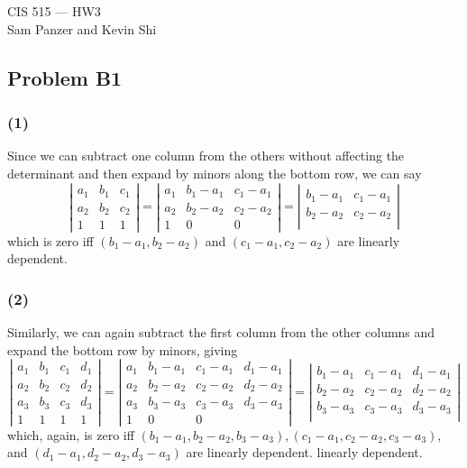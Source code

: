 \documentclass{article}
\begin{document}
\begin{center}CIS 515 --- HW3\\Sam Panzer and Kevin Shi\end{center}
\subsection{Problem B1}
\subsubsection{(1)}
Since we can subtract one column from the others without affecting the
determinant and then expand by minors along the bottom row, we can say
\[
\left|
\begin{array}{ccc}
  a_1 & b_1 & c_1 \\
  a_2 & b_2 & c_2 \\
  1 & 1 & 1
\end{array}
\right|
=
\left|
\begin{array}{ccc}
  a_1 & b_1 - a_1 & c_1 -a_1 \\
  a_2 & b_2  - a_2& c_2  - a_2\\
  1 & 0 & 0
\end{array}
\right|
=\left|
\begin{array}{cc}
  b_1 - a_1 & c_1 - a_1 \\
  b_2 - a_2 & c_2 - a_2 \\
\end{array}
\right|
\]
which is zero iff $(b_1 - a_1, b_2 - a_2)$ and $(c_1 - a_1, c_2 - a_2)$ are
linearly dependent.
\subsubsection{(2)}
Similarly, we can again subtract the first column from the other columns and
expand the bottom row by minors, giving
\[
\left|
\begin{array}{cccc}
  a_1 & b_1 & c_1 & d_1 \\
  a_2 & b_2 & c_2  & d_2\\
  a_3 & b_3 & c_3  & d_3\\
  1 & 1 & 1 & 1
\end{array}
\right|
=
\left|
\begin{array}{cccc}
  a_1 & b_1 - a_1 & c_1 - a_1 & d_1 - a_1\\
  a_2 & b_2 - a_2 & c_2 - a_2 & d_2 - a_2\\
  a_3 & b_3 - a_3 & c_3 - a_3 & d_3 - a_3\\
  1 & 0 & 0
\end{array}
\right|
=\left|
\begin{array}{ccc}
  b_1 - a_1 & c_1 - a_1 & d_1 - a_1 \\
  b_2 - a_2 & c_2 - a_2 & d_2 - a_2\\
  b_3 - a_3 & c_3 - a_3 & d_3 - a_3\\
\end{array}
\right|
\]
which, again, is zero iff 
$(b_1 - a_1, b_2 - a_2, b_3 - a_3),(c_1 - a_1, c_2 - a_2, c_3 - a_3)$, and
$ (d_1 - a_1, d_2 - a_2, d_3 - a_3)$ are linearly dependent.
linearly dependent.
\end{document}
